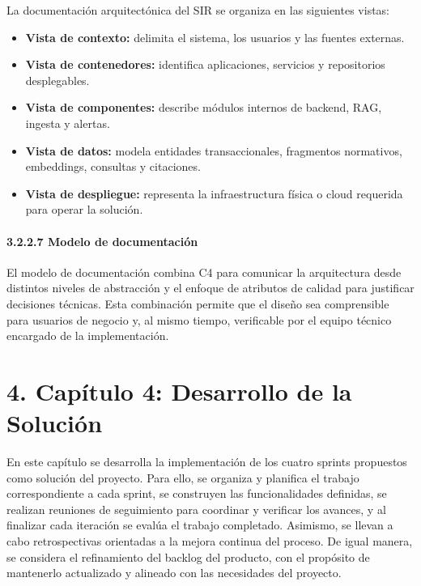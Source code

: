 \documentclass[12pt,a4paper,oneside]{report}
\begin{document}
La documentación arquitectónica del SIR se organiza en las siguientes
vistas:

\begin{itemize}
\item
  \textbf{Vista de contexto:} delimita el sistema, los usuarios y las
  fuentes externas.
\item
  \textbf{Vista de contenedores:} identifica aplicaciones, servicios y
  repositorios desplegables.
\item
  \textbf{Vista de componentes:} describe módulos internos de backend,
  RAG, ingesta y alertas.
\item
  \textbf{Vista de datos:} modela entidades transaccionales, fragmentos
  normativos, embeddings, consultas y citaciones.
\item
  \textbf{Vista de despliegue:} representa la infraestructura física o
  cloud requerida para operar la solución.
\end{itemize}

\paragraph{3.2.2.7 Modelo de
documentación}\label{modelo-de-documentaciuxf3n}

El modelo de documentación combina C4 para comunicar la arquitectura
desde distintos niveles de abstracción y el enfoque de atributos de
calidad para justificar decisiones técnicas. Esta combinación permite
que el diseño sea comprensible para usuarios de negocio y, al mismo
tiempo, verificable por el equipo técnico encargado de la
implementación.

\section{4. Capítulo 4: Desarrollo de la
Solución}\label{capuxedtulo-4-desarrollo-de-la-soluciuxf3n}

En este capítulo se desarrolla la implementación de los cuatro sprints
propuestos como solución del proyecto. Para ello, se organiza y
planifica el trabajo correspondiente a cada sprint, se construyen las
funcionalidades definidas, se realizan reuniones de seguimiento para
coordinar y verificar los avances, y al finalizar cada iteración se
evalúa el trabajo completado. Asimismo, se llevan a cabo retrospectivas
orientadas a la mejora continua del proceso. De igual manera, se
considera el refinamiento del backlog del producto, con el propósito de
mantenerlo actualizado y alineado con las necesidades del proyecto.
\end{document}

